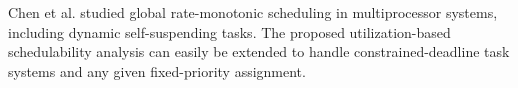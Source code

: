 Chen et al. \cite{ChenHLRTSS2015} studied global rate-monotonic scheduling in multiprocessor systems, including dynamic self-suspending tasks. The proposed utilization-based schedulability analysis  can easily be extended to handle constrained-deadline task systems and any given fixed-priority assignment.
  
  




  
